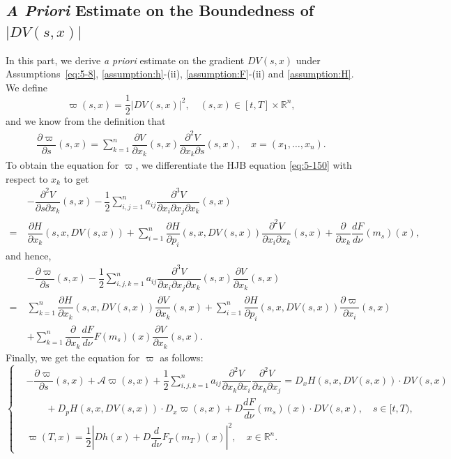 \documentclass[11pt]{article}
\numberwithin{equation}{section}
\newcommand{\brn}{{\mathbb{R}^n}}
\newcommand{\1}{\mbox{1\hspace{-1mm}I}}
\begin{document}
\subsection{\textit{A Priori} Estimate on the Boundedness of $|DV(s,x)|$}\label{subsec:DV}

In this part, we derive \textit{a priori} estimate on the gradient $DV(s,x)$ under Assumptions~\ref{eq:5-8}, \ref{assumption:h}-(ii), \ref{assumption:F}-(ii) and \ref{assumption:H}. We define 
\begin{equation*}\label{eq:5-33}
    \varpi(s,x)=\dfrac{1}{2}|DV(s,x)|^{2},\quad (s,x)\in[t,T]\times\brn, 
\end{equation*}
and we know from the definition that
\begin{align*}
    \dfrac{\partial \varpi}{\partial s}(s,x)=\sum_{k=1}^{n}\dfrac{\partial V}{\partial x_{k}}(s,x)\dfrac{\partial^{2}V}{\partial x_{k}\partial s}(s,x),\quad x=\left(x_1,\dots,x_n\right).
\end{align*}
To obtain the equation for $\varpi$, we differentiate the HJB equation \eqref{eq:5-150} with respect to $x_{k}$ to get 
\begin{align*}
    & -\dfrac{\partial^{2} V}{\partial s\partial x_{k}}(s,x)-\dfrac{1}{2}\sum_{i,j=1}^{n}a_{ij}\dfrac{\partial^{3}V}{\partial x_{i}\partial x_{j}\partial x_{k}}(s,x)\\
    =\ & \dfrac{\partial H}{\partial x_{k}}(s,x,DV(s,x))+\sum_{i=1}^{n}\dfrac{\partial H}{\partial p_{i}}(s,x,DV(s,x))\dfrac{\partial^{2}V}{\partial x_{i}\partial x_{k}}(s,x)+\dfrac{\partial}{\partial x_{k}}\dfrac{dF}{d\nu}\left(m_s\right)(x),
\end{align*}
and hence,
\begin{align*}
    &-\dfrac{\partial \varpi}{\partial s}(s,x)-\dfrac{1}{2}\sum_{i,j,k=1}^{n}a_{ij}\dfrac{\partial^{3}V}{\partial x_{i}\partial x_{j}\partial x_{k}}(s,x)\dfrac{\partial V}{\partial x_{k}}(s,x)\\
    =\ & \sum_{k=1}^{n}\dfrac{\partial H}{\partial x_{k}}(s,x,DV(s,x))\dfrac{\partial V}{\partial x_{k}}(s,x)+\sum_{i=1}^{n}\dfrac{\partial H}{\partial p_{i}}(s,x,DV(s,x))\dfrac{\partial \varpi}{\partial x_{i}}(s,x)\\
    & +\sum_{k=1}^{n}\dfrac{\partial}{\partial x_{k}}\dfrac{d F}{d\nu}F\left(m_s\right)(x)\dfrac{\partial V}{\partial x_{k}}(s,x).
\end{align*}
Finally, we get the equation for $\varpi$ as follows:
\begin{equation}\label{eq:5-34}
    \left\{
    \begin{aligned}
        &-\dfrac{\partial \varpi}{\partial s}(s,x)+\mathcal{A}\varpi(s,x)+\dfrac{1}{2}\sum_{i,j,k=1}^{n}a_{ij}\dfrac{\partial^{2}V}{\partial x_{k}\partial x_{i}}\dfrac{\partial^{2}V}{\partial x_{k}\partial x_{j}}= D_{x}H(s,x,DV(s,x))\cdot DV(s,x)\\
        &\qquad +D_{p} H(s,x,DV(s,x))\cdot D_{x}\varpi(s,x)+D\dfrac{dF}{d\nu}\left(m_s\right)(x)\cdot DV(s,x),\quad s\in[t,T),\\
        &\varpi(T,x)=\dfrac{1}{2}\left|Dh(x)+D\dfrac{d}{d\nu}F_{T}\left(m_T\right)(x)\right|^{2},\quad x\in\brn.
    \end{aligned}
    \right.
\end{equation}
\end{document}
